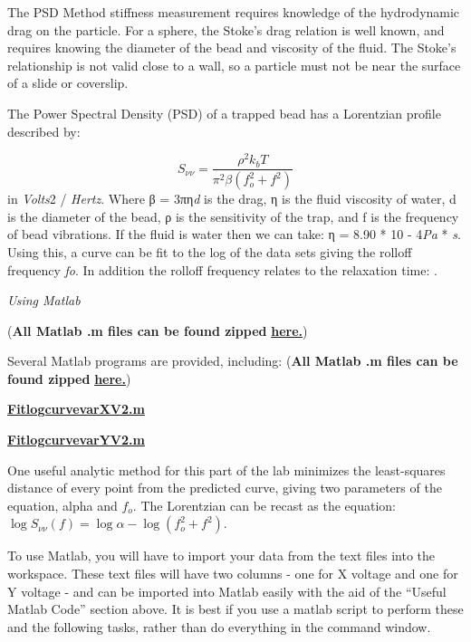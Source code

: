 \documentclass{../lab}
\begin{document}
The PSD Method stiffness measurement requires knowledge of the hydrodynamic drag on the particle. For a sphere, the Stoke's drag relation is well known, and requires knowing the diameter of the bead and viscosity of the fluid. The Stoke's relationship is not valid close to a wall, so a particle must not be near the surface of a slide or coverslip.

The Power Spectral Density (PSD)  of a trapped bead has a Lorentzian profile described by:

\begin{equation}
    S_{\nu\nu} = \frac{\rho^2 k_b T}{\pi^2 \beta(f_o^2+f^2)}
\end{equation}
in \emph{V}\emph{o}\emph{l}\emph{t}\emph{s}2 / \emph{H}\emph{e}\emph{r}\emph{t}\emph{z}. Where β = 3πη\emph{d} is the drag, η is the fluid viscosity of water, d is the diameter of the bead, ρ is the sensitivity of the trap, and f is the frequency of bead vibrations. If the fluid is water then we can take: η = 8.90 * 10 - 4\emph{P}\emph{a} * \emph{s}. Using this, a curve can be fit to the log of the data sets giving the rolloff frequency \emph{f}\emph{o}. In addition the rolloff frequency relates to the relaxation time: . ​

\emph{Using Matlab}

(\textbf{All Matlab .m files can be found zipped }\href{http://dev-physicsadv.pantheon.berkeley.edu/sites/default/files/ZIP\_files/OTZ\_Matlab\_files.zip}{\textbf{here.}})

Several Matlab programs are provided, including: (\textbf{All Matlab .m files can be found zipped }\href{http://dev-physicsadv.pantheon.berkeley.edu/sites/default/files/ZIP\_files/OTZ\_Matlab\_files.zip}{\textbf{here.}})

\href{http://dev-physicsadv.pantheon.berkeley.edu/sites/default/files/matlab\_fitting/FitlogcurvevarXV2.m}{\textbf{FitlogcurvevarXV2.m}}

\href{http://dev-physicsadv.pantheon.berkeley.edu/sites/default/files/matlab\_fitting/FitlogcurvevarYV2.m}{\textbf{FitlogcurvevarYV2.m}}

One useful analytic method for this part of the lab minimizes the least-squares distance of every point from the predicted curve, giving two parameters of the equation, alpha and $ f_o $. The Lorentzian can be recast as the equation: $ \log{S_{\nu\nu}(f)} = \log{\alpha}-\log{(f_o^2+f^2)} $.

To use Matlab, you will have to import your data from the text files into the workspace. These text files will have two columns - one for X voltage and one for Y voltage - and can be imported into Matlab easily with the aid of the ``Useful Matlab Code'' section above. It is best if you use a matlab script to perform these and the following tasks, rather than do everything in the command window.
\end{document}
